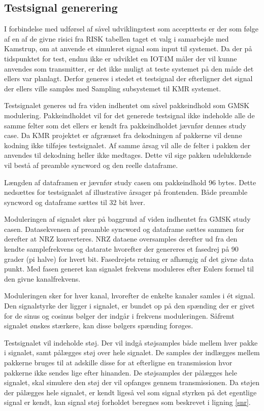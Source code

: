 \begin{appendices}
\pagebreak

\chapter{Testsignal generering} \label{appendix::testsignal_generering}
I forbindelse med udførsel af såvel udviklingstest som accepttests er der som følge af en af de givne risici fra RISK tabellen taget et valg i samarbejde med Kamstrup, om at anvende et simuleret signal som input til systemet. Da der på tidspunktet for test, endnu ikke er udviklet en IOT4M måler der vil kunne anvendes som transmitter, er det ikke muligt at teste systemet på den måde det ellers var planlagt. Derfor generes i stedet et testsignal der efterligner det signal der ellers ville samples med Sampling subsystemet til KMR systemet. 

Testsignalet generes ud fra viden indhentet om såvel pakkeindhold som GMSK modulering. Pakkeindholdet vil for det generede testsignal ikke indeholde alle de samme felter som det ellers er kendt fra pakkeindholdet jævnfør dennes study case. Da KMR projektet er afgrænset fra dekodningen af pakkerne vil denne kodning ikke tilføjes testsignalet. Af samme årsag vil alle de felter i pakken der anvendes til dekodning heller ikke medtages. Dette vil sige pakken udelukkende vil bestå af preamble syncword og den reelle dataframe. 

Længden af dataframen er jævnfør study casen om pakkeindhold 96 bytes. Dette nedsættes for testsignalet af illustrative årsager på frontenden. Både preamble syncword og dataframe sættes til 32 bit hver. 

Moduleringen af signalet sker på baggrund af viden indhentet fra GMSK study casen. Datasekvensen af preamble syncword og dataframe sættes sammen for derefter at NRZ konverteres. NRZ dataene oversamples derefter ud fra den kendte samplefrekvens og datarate hvorefter der genereres et fasedrej på 90 grader (pi halve) for hvert bit. Fasedrejets retning er afhængig af det givne data punkt. Med fasen generet kan signalet frekvens moduleres efter Eulers formel til den givne kanalfrekvens. 

Moduleringen sker for hver kanal, hvorefter de enkelte kanaler samles i ét signal. Den signalstyrke der ligger i signalet, er bundet op på den spænding der er givet for de sinus og cosinus bølger der indgår i frekvens moduleringen. Såfremt signalet ønskes stærkere, kan disse bølgers spænding forøges. 

Testsignalet vil indeholde støj. Der vil indgå støjsamples både mellem hver pakke i signalet, samt pålægges støj over hele signalet. De samples der indlægges mellem pakkerne bruges til at adskille disse for at efterligne en transmission hvor pakkerne ikke sendes lige efter hinanden. De støjsamples der pålægges hele signalet, skal simulere den støj der vil opfanges gennem transmissionen. Da støjen der pålægges hele signalet, er kendt ligeså vel som signal styrken på det egentlige signal er kendt, kan signal støj forholdet beregnes som beskrevet i ligning \ref{snr}. 


\end{appendices}

